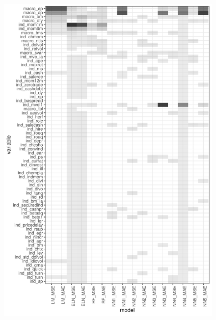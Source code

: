 \documentclass[a4paper, table]{article}
\begin{document}
\begin{figure}
	\includegraphics{empirical_sample_2_vi.pdf}
\end{figure}
\end{document}
